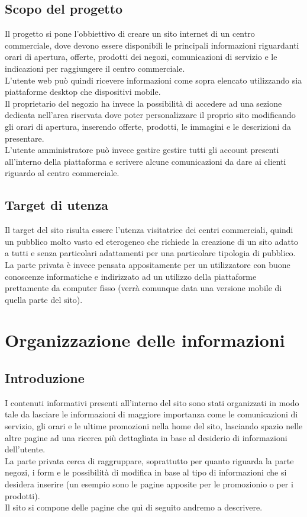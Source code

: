 \documentclass[a4paper,12pt]{article}
\begin{document}
\subsection{Scopo del progetto}
Il progetto si pone l'obbiettivo di creare un sito internet di un centro commerciale, dove devono essere disponibili le principali informazioni riguardanti orari di apertura, offerte, prodotti dei negozi, comunicazioni di servizio e le indicazioni per raggiungere il centro commerciale. \\
L'utente web può quindi ricevere informazioni come sopra elencato utilizzando sia piattaforme desktop che dispositivi mobile.\\
Il proprietario del negozio ha invece la possibilità di accedere ad una sezione dedicata nell'area riservata dove poter personalizzare il proprio sito modificando gli orari di apertura, inserendo offerte, prodotti, le immagini e le descrizioni da presentare.\\
L'utente amministratore può invece gestire gestire tutti gli account presenti all'interno della piattaforma e scrivere alcune comunicazioni da dare ai clienti riguardo al centro commerciale.\\
\subsection{Target di utenza}
Il target del sito risulta essere l'utenza visitatrice dei centri commerciali, quindi un pubblico molto vasto ed eterogeneo che richiede la creazione di un sito adatto a tutti e senza particolari adattamenti per una particolare tipologia di pubblico.\\
La parte privata è invece pensata appositamente per un utilizzatore con buone conoscenze informatiche e indirizzato ad un utilizzo della piattaforme prettamente da computer fisso (verrà comunque data una versione mobile di quella parte del sito).
\section{Organizzazione delle informazioni}
\subsection{Introduzione}
I contenuti informativi presenti all'interno del sito sono stati organizzati in modo tale da lasciare le informazioni di maggiore importanza come le comunicazioni di servizio, gli orari e le ultime promozioni nella home del sito, lasciando spazio nelle altre pagine ad una ricerca più dettagliata in base al desiderio di informazioni dell'utente.\\
La parte privata cerca di raggruppare, soprattutto per quanto riguarda la parte negozi, i form e le possibilità di modifica in base al tipo di informazioni che si desidera inserire (un esempio sono le pagine apposite per le promozionio o per i prodotti).\\
Il sito si compone delle pagine che quì di seguito andremo a descrivere.
\end{document}
